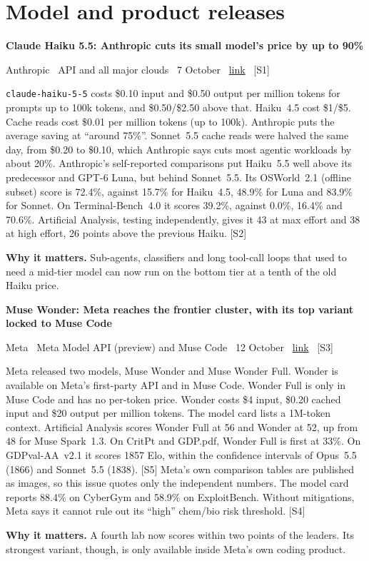 \documentclass[11pt,a4paper]{article}
\newcommand{\entry}[4]{%
  \par\vspace{0.7em}%
  {\sffamily\bfseries\color{brandink}#1}\par
  {\footnotesize\color{brandgrey}#2 \textbullet\ \href{#3}{link} \textbullet\ \srcref{#4}}\par
  \vspace{0.15em}}
\newcommand{\why}[1]{\par{\small\textbf{Why it matters.} #1}\par}
\newcommand{\srcref}[1]{\textcolor{brandaccent}{[S#1]}}
\begin{document}
\section{Model and product releases}

\entry{Claude Haiku 5.5: Anthropic cuts its small model's price by up to 90\%}{Anthropic \textbullet\ API and all major clouds \textbullet\ 7 October}{https://www.anthropic.com/claude-haiku-5-5}{1}
\texttt{claude-haiku-5-5} costs \$0.10 input and \$0.50 output per million tokens for prompts
up to 100k tokens, and \$0.50/\$2.50 above that. Haiku~4.5 cost \$1/\$5. Cache reads cost \$0.01 per million
tokens (up to 100k). Anthropic puts the average saving at ``around 75\%''. Sonnet~5.5 cache reads were
halved the same day, from \$0.20 to \$0.10, which Anthropic says cuts most agentic workloads by about 20\%.
Anthropic's self-reported comparisons put Haiku~5.5 well above its predecessor and GPT-6 Luna, but behind Sonnet~5.5.
Its OSWorld~2.1 (offline subset) score is 72.4\%, against 15.7\% for Haiku~4.5, 48.9\% for Luna and 83.9\% for Sonnet. On Terminal-Bench~4.0 it scores 39.2\%,
against 0.0\%, 16.4\% and 70.6\%. Artificial Analysis, testing independently, gives it 43 at
max effort and 38 at high effort, 26 points above the previous Haiku. \srcref{2}
\why{Sub-agents, classifiers and long tool-call loops that used to need a mid-tier model can now run on the bottom tier at a tenth of the old Haiku price.}

\entry{Muse Wonder: Meta reaches the frontier cluster, with its top variant locked to Muse Code}{Meta \textbullet\ Meta Model API (preview) and Muse Code \textbullet\ 12 October}{https://about.fb.com/news/2026/10/introducing-muse-wonder-models/}{3}
Meta released two models, Muse Wonder and Muse Wonder Full. Wonder is available on Meta's first-party API and in Muse Code.
Wonder Full is only in Muse Code and has no per-token price. Wonder
costs \$4 input, \$0.20 cached input and \$20 output per million tokens. The model card lists a 1M-token
context. Artificial Analysis scores Wonder Full at 56 and Wonder at 52, up from 48 for
Muse Spark~1.3. On CritPt and GDP.pdf, Wonder Full is first at 33\%. On GDPval-AA~v2.1 it scores 1857 Elo, within the confidence
intervals of Opus~5.5 (1866) and Sonnet~5.5 (1838). \srcref{5} Meta's own comparison tables
are published as images, so this issue quotes only the independent numbers. The model card reports
88.4\% on CyberGym and 58.9\% on ExploitBench. Without mitigations, Meta says it cannot rule out
its ``high'' chem/bio risk threshold. \srcref{4}
\why{A fourth lab now scores within two points of the leaders. Its strongest variant, though, is only available inside Meta's own coding product.}
\end{document}
